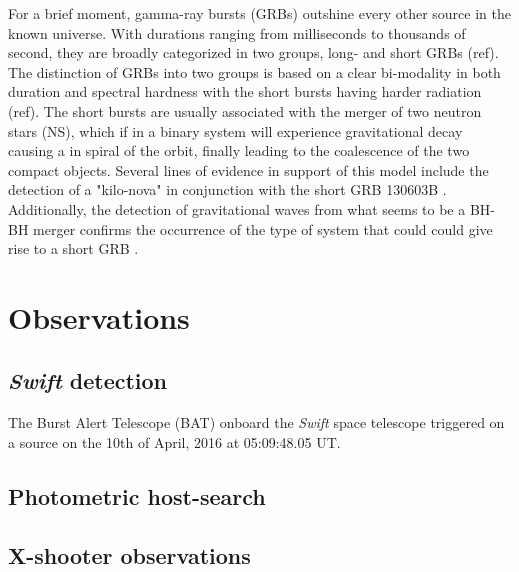 \documentclass[a4paper,fleqn,usenatbib]{mnras}
\begin{document}
For a brief moment, gamma-ray bursts (GRBs) outshine every other source in the
known universe. With durations ranging from milliseconds to thousands of second,
they are broadly categorized in two groups, long- and short GRBs (ref). The
distinction of GRBs into two groups is based on a clear bi-modality in both
duration and spectral hardness with the short bursts having harder radiation
(ref). The short bursts are usually associated with the merger of two neutron
stars (NS), which if in a binary system will experience gravitational decay
causing a in spiral of the orbit, finally leading to the coalescence of the two
compact objects. Several lines of evidence in support of this model include the
detection of a "kilo-nova" in conjunction with the short GRB 130603B
\citep{Tanvir2013, Berger2013}. Additionally, the detection of gravitational
waves from what seems to be a BH-BH merger confirms the occurrence of the type
of system that could could give rise to a short GRB  \citep{Abbott2016}.
%

\section{Observations}
\label{sec:Methods} %

\subsection{\textit{Swift} detection}
The Burst Alert Telescope (BAT) onboard the \textit{Swift} space telescope
\citep{Gehrels2004} triggered on a source on the 10th of April, 2016 at
05:09:48.05 UT. \cite{Norris2011}

\subsection{Photometric host-search}




\subsection{X-shooter observations}
\end{document}
